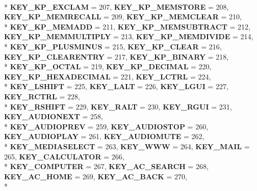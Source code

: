 \begin{DoxyCompactItemize}
\\*
{\bfseries K\+E\+Y\+\_\+\+K\+P\+\_\+\+E\+X\+C\+L\+A\+M} = 207, 
{\bfseries K\+E\+Y\+\_\+\+K\+P\+\_\+\+M\+E\+M\+S\+T\+O\+R\+E} = 208, 
{\bfseries K\+E\+Y\+\_\+\+K\+P\+\_\+\+M\+E\+M\+R\+E\+C\+A\+L\+L} = 209, 
{\bfseries K\+E\+Y\+\_\+\+K\+P\+\_\+\+M\+E\+M\+C\+L\+E\+A\+R} = 210, 
\\*
{\bfseries K\+E\+Y\+\_\+\+K\+P\+\_\+\+M\+E\+M\+A\+D\+D} = 211, 
{\bfseries K\+E\+Y\+\_\+\+K\+P\+\_\+\+M\+E\+M\+S\+U\+B\+T\+R\+A\+C\+T} = 212, 
{\bfseries K\+E\+Y\+\_\+\+K\+P\+\_\+\+M\+E\+M\+M\+U\+L\+T\+I\+P\+L\+Y} = 213, 
{\bfseries K\+E\+Y\+\_\+\+K\+P\+\_\+\+M\+E\+M\+D\+I\+V\+I\+D\+E} = 214, 
\\*
{\bfseries K\+E\+Y\+\_\+\+K\+P\+\_\+\+P\+L\+U\+S\+M\+I\+N\+U\+S} = 215, 
{\bfseries K\+E\+Y\+\_\+\+K\+P\+\_\+\+C\+L\+E\+A\+R} = 216, 
{\bfseries K\+E\+Y\+\_\+\+K\+P\+\_\+\+C\+L\+E\+A\+R\+E\+N\+T\+R\+Y} = 217, 
{\bfseries K\+E\+Y\+\_\+\+K\+P\+\_\+\+B\+I\+N\+A\+R\+Y} = 218, 
\\*
{\bfseries K\+E\+Y\+\_\+\+K\+P\+\_\+\+O\+C\+T\+A\+L} = 219, 
{\bfseries K\+E\+Y\+\_\+\+K\+P\+\_\+\+D\+E\+C\+I\+M\+A\+L} = 220, 
{\bfseries K\+E\+Y\+\_\+\+K\+P\+\_\+\+H\+E\+X\+A\+D\+E\+C\+I\+M\+A\+L} = 221, 
{\bfseries K\+E\+Y\+\_\+\+L\+C\+T\+R\+L} = 224, 
\\*
{\bfseries K\+E\+Y\+\_\+\+L\+S\+H\+I\+F\+T} = 225, 
{\bfseries K\+E\+Y\+\_\+\+L\+A\+L\+T} = 226, 
{\bfseries K\+E\+Y\+\_\+\+L\+G\+U\+I} = 227, 
{\bfseries K\+E\+Y\+\_\+\+R\+C\+T\+R\+L} = 228, 
\\*
{\bfseries K\+E\+Y\+\_\+\+R\+S\+H\+I\+F\+T} = 229, 
{\bfseries K\+E\+Y\+\_\+\+R\+A\+L\+T} = 230, 
{\bfseries K\+E\+Y\+\_\+\+R\+G\+U\+I} = 231, 
{\bfseries K\+E\+Y\+\_\+\+A\+U\+D\+I\+O\+N\+E\+X\+T} = 258, 
\\*
{\bfseries K\+E\+Y\+\_\+\+A\+U\+D\+I\+O\+P\+R\+E\+V} = 259, 
{\bfseries K\+E\+Y\+\_\+\+A\+U\+D\+I\+O\+S\+T\+O\+P} = 260, 
{\bfseries K\+E\+Y\+\_\+\+A\+U\+D\+I\+O\+P\+L\+A\+Y} = 261, 
{\bfseries K\+E\+Y\+\_\+\+A\+U\+D\+I\+O\+M\+U\+T\+E} = 262, 
\\*
{\bfseries K\+E\+Y\+\_\+\+M\+E\+D\+I\+A\+S\+E\+L\+E\+C\+T} = 263, 
{\bfseries K\+E\+Y\+\_\+\+W\+W\+W} = 264, 
{\bfseries K\+E\+Y\+\_\+\+M\+A\+I\+L} = 265, 
{\bfseries K\+E\+Y\+\_\+\+C\+A\+L\+C\+U\+L\+A\+T\+O\+R} = 266, 
\\*
{\bfseries K\+E\+Y\+\_\+\+C\+O\+M\+P\+U\+T\+E\+R} = 267, 
{\bfseries K\+E\+Y\+\_\+\+A\+C\+\_\+\+S\+E\+A\+R\+C\+H} = 268, 
{\bfseries K\+E\+Y\+\_\+\+A\+C\+\_\+\+H\+O\+M\+E} = 269, 
{\bfseries K\+E\+Y\+\_\+\+A\+C\+\_\+\+B\+A\+C\+K} = 270, 
\\*

\end{DoxyCompactItemize}
